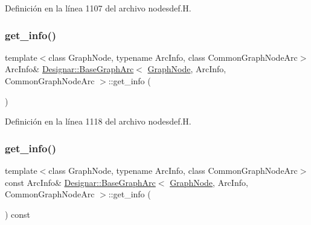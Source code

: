 Definición en la línea 1107 del archivo nodesdef.\+H.

\mbox{\label{class_designar_1_1_base_graph_arc_a90c613c982dec0d38acd6051c26a5562}} 
\subsubsection{\texorpdfstring{get\+\_\+info()}{get\_info()}\hspace{0.1cm}{\footnotesize\ttfamily [1/2]}}
{\footnotesize\ttfamily template$<$class Graph\+Node, typename Arc\+Info, class Common\+Graph\+Node\+Arc$>$ \\
Arc\+Info\& \hyperlink{class_designar_1_1_base_graph_arc}{Designar\+::\+Base\+Graph\+Arc}$<$ \hyperlink{class_designar_1_1_graph_node}{Graph\+Node}, Arc\+Info, Common\+Graph\+Node\+Arc $>$\+::get\+\_\+info (\begin{DoxyParamCaption}{ }\end{DoxyParamCaption})\hspace{0.3cm}{\ttfamily [inline]}}



Definición en la línea 1118 del archivo nodesdef.\+H.

\mbox{\label{class_designar_1_1_base_graph_arc_a90dce6365bbeef65a6ff5fa343b27710}} 
\subsubsection{\texorpdfstring{get\+\_\+info()}{get\_info()}\hspace{0.1cm}{\footnotesize\ttfamily [2/2]}}
{\footnotesize\ttfamily template$<$class Graph\+Node, typename Arc\+Info, class Common\+Graph\+Node\+Arc$>$ \\
const Arc\+Info\& \hyperlink{class_designar_1_1_base_graph_arc}{Designar\+::\+Base\+Graph\+Arc}$<$ \hyperlink{class_designar_1_1_graph_node}{Graph\+Node}, Arc\+Info, Common\+Graph\+Node\+Arc $>$\+::get\+\_\+info (\begin{DoxyParamCaption}{ }\end{DoxyParamCaption}) const\hspace{0.3cm}{\ttfamily [inline]}}



